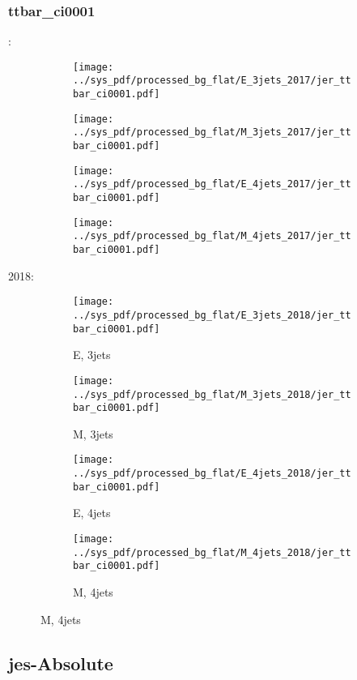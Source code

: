 \documentclass{beamer}
\begin{document}
\begin{frame}
\frametitle{ttbar_ci0001}
\fontsize{5}{1}:
\begin{figure}
\centering
\begin{subfigure}[b]{0.24\textwidth}
\texttt{[image: ../sys\_pdf/processed\_bg\_flat/E\_3jets\_2017/jer\_ttbar\_ci0001.pdf]}
\end{subfigure}
\begin{subfigure}[b]{0.24\textwidth}
\texttt{[image: ../sys\_pdf/processed\_bg\_flat/M\_3jets\_2017/jer\_ttbar\_ci0001.pdf]}
\end{subfigure}
\begin{subfigure}[b]{0.24\textwidth}
\texttt{[image: ../sys\_pdf/processed\_bg\_flat/E\_4jets\_2017/jer\_ttbar\_ci0001.pdf]}
\end{subfigure}
\begin{subfigure}[b]{0.24\textwidth}
\texttt{[image: ../sys\_pdf/processed\_bg\_flat/M\_4jets\_2017/jer\_ttbar\_ci0001.pdf]}
\end{subfigure}
\end{figure}
2018:
\begin{figure}
\centering
\begin{subfigure}[b]{0.24\textwidth}
\texttt{[image: ../sys\_pdf/processed\_bg\_flat/E\_3jets\_2018/jer\_ttbar\_ci0001.pdf]}
\captionsetup{font=tiny}
\caption{E, 3jets}
\end{subfigure}
\begin{subfigure}[b]{0.24\textwidth}
\texttt{[image: ../sys\_pdf/processed\_bg\_flat/M\_3jets\_2018/jer\_ttbar\_ci0001.pdf]}
\captionsetup{font=tiny}
\caption{M, 3jets}
\end{subfigure}
\begin{subfigure}[b]{0.24\textwidth}
\texttt{[image: ../sys\_pdf/processed\_bg\_flat/E\_4jets\_2018/jer\_ttbar\_ci0001.pdf]}
\captionsetup{font=tiny}
\caption{E, 4jets}
\end{subfigure}
\begin{subfigure}[b]{0.24\textwidth}
\texttt{[image: ../sys\_pdf/processed\_bg\_flat/M\_4jets\_2018/jer\_ttbar\_ci0001.pdf]}
\captionsetup{font=tiny}
\caption{M, 4jets}
\end{subfigure}
\end{figure}
\end{frame}


\subsection{jes-Absolute}
\end{document}
